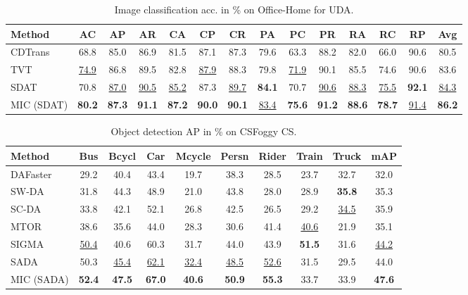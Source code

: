 \documentclass[10pt,twocolumn,letterpaper]{article}
\begin{document}
 \begin{table}
  \centering     
  \caption{Image classification acc. in \% on Office-Home for UDA.}
  \setlength{\tabcolsep}{0.8pt}
  \scriptsize
  \begin{tabular}{l|cccccccccccc|c}
    \hline
    Method & AC & AP & AR & CA & CP & CR & PA & PC & PR & RA & RC & RP & Avg 
    \\\hline \hline

	CDTrans \cite{xu2021cdtrans} & 68.8 & 85.0 & 86.9 & 81.5 & 87.1 & 87.3 & 79.6 & 63.3 & 88.2 & 82.0 & 66.0 & 90.6 & 80.5 \\
	TVT \cite{yang2021tvt}  & \underline{74.9} & 86.8 & 89.5 & 82.8 & \underline{87.9} & 88.3 & 79.8 & \underline{71.9} & 90.1 & 85.5 & 74.6 & 90.6 & 83.6 \\
    SDAT \cite{rangwani2022closer} & 70.8 & \underline{87.0} & \underline{90.5} & \underline{85.2} & 87.3 & \underline{89.7} & \textbf{84.1} & 70.7 & \underline{90.6} & \underline{88.3} & \underline{75.5} & \textbf{92.1} & \underline{84.3} \\
    MIC (SDAT) & \textbf{80.2} & \textbf{87.3} & \textbf{91.1} & \textbf{87.2} & \textbf{90.0} & \textbf{90.1} & \underline{83.4} & \textbf{75.6}	& \textbf{91.2} & \textbf{88.6} & \textbf{78.7} & \underline{91.4} & \textbf{86.2}
    \\\hline
  \end{tabular}


  \label{tab:officehome}
\end{table} \begin{table}
	\centering
	\caption{Object detection AP in \% on CSFoggy CS.
}
	\scriptsize
	\setlength{\tabcolsep}{2pt}
	\label{tab:dadetection1}
	\begin{tabular}{l|cccccccc|c}
		\hline

		Method                          & Bus  & Bcycl  & Car   &Mcycle & Persn & Rider & Train & Truck & mAP\\
		\hline \hline
		DAFaster \cite{chen2018domain} & 29.2 & 40.4   & 43.4  & 19.7  & 38.3  & 28.5& 23.7& 32.7& 32.0\\
		SW-DA \cite{saito2019strong}    & 31.8 & 44.3   &48.9   &21.0   &43.8   &28.0 &28.9 &\textbf{35.8} &35.3 \\
		SC-DA \cite{zhu2019adapting}       & 33.8 & 42.1   & 52.1  & 26.8  & 42.5  & 26.5 & 29.2 & \underline{34.5} &35.9 \\
		MTOR \cite{cai2019exploring}        & 38.6 & 35.6   & 44.0  & 28.3  & 30.6  & 41.4 & \underline{40.6} & 21.9 & 35.1 \\
		SIGMA \cite{li2022sigma} & \underline{50.4} & 40.6 & 60.3 & 31.7 & 44.0 & 43.9 & \textbf{51.5} & 31.6 & \underline{44.2} \\
		SADA \cite{chen2021scale}& 50.3 & \underline{45.4}   &\underline{62.1}   &\underline{32.4}   &\underline{48.5}   & \underline{52.6} &31.5 &29.5 &44.0 \\
MIC (SADA) & \textbf{52.4} & \textbf{47.5} & \textbf{67.0} & \textbf{40.6} & \textbf{50.9} & \textbf{55.3} & 33.7 & 33.9 & \textbf{47.6} \\
		\hline
	\end{tabular}
\end{table} 
\end{document}
